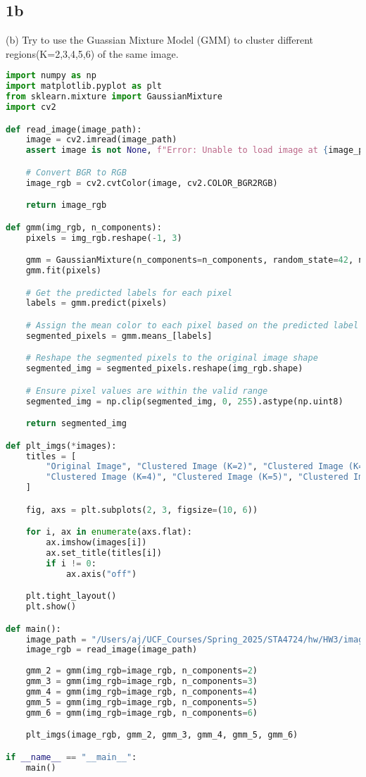 \documentclass[12pt,letterpaper]{article}
\begin{document}
\subsection*{1b}
(b) Try to use the Guassian Mixture Model (GMM) to cluster different regions(K=2,3,4,5,6) of the same image.
\begin{lstlisting}[language=Python, breaklines=true, columns=flexible, frame=single]
import numpy as np
import matplotlib.pyplot as plt
from sklearn.mixture import GaussianMixture
import cv2

def read_image(image_path):
    image = cv2.imread(image_path)
    assert image is not None, f"Error: Unable to load image at {image_path}"

    # Convert BGR to RGB
    image_rgb = cv2.cvtColor(image, cv2.COLOR_BGR2RGB)

    return image_rgb

def gmm(img_rgb, n_components):
    pixels = img_rgb.reshape(-1, 3)

    gmm = GaussianMixture(n_components=n_components, random_state=42, n_init=10)
    gmm.fit(pixels)

    # Get the predicted labels for each pixel
    labels = gmm.predict(pixels)

    # Assign the mean color to each pixel based on the predicted label
    segmented_pixels = gmm.means_[labels]

    # Reshape the segmented pixels to the original image shape
    segmented_img = segmented_pixels.reshape(img_rgb.shape)

    # Ensure pixel values are within the valid range
    segmented_img = np.clip(segmented_img, 0, 255).astype(np.uint8)

    return segmented_img

def plt_imgs(*images):
    titles = [
        "Original Image", "Clustered Image (K=2)", "Clustered Image (K=3)",
        "Clustered Image (K=4)", "Clustered Image (K=5)", "Clustered Image (K=6)"
    ]

    fig, axs = plt.subplots(2, 3, figsize=(10, 6))

    for i, ax in enumerate(axs.flat):
        ax.imshow(images[i])
        ax.set_title(titles[i])
        if i != 0:
            ax.axis("off")

    plt.tight_layout()
    plt.show()

def main():
    image_path = "/Users/aj/UCF_Courses/Spring_2025/STA4724/hw/HW3/image.jpg"
    image_rgb = read_image(image_path)
    
    gmm_2 = gmm(img_rgb=image_rgb, n_components=2)
    gmm_3 = gmm(img_rgb=image_rgb, n_components=3)
    gmm_4 = gmm(img_rgb=image_rgb, n_components=4)
    gmm_5 = gmm(img_rgb=image_rgb, n_components=5)
    gmm_6 = gmm(img_rgb=image_rgb, n_components=6)

    plt_imgs(image_rgb, gmm_2, gmm_3, gmm_4, gmm_5, gmm_6)

if __name__ == "__main__":
    main()
\end{lstlisting}
\pagebreak
\end{document}
